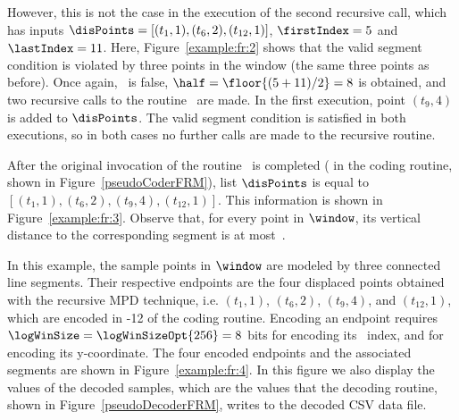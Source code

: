\clearpage




However, this is not the case in the execution of the second recursive call, which has inputs $\disPoints=[(t_1,1), (t_{6},2), (t_{12},1)]$, $\firstIndex = 5$ and $\lastIndex = 11$. Here, Figure~\ref{example:fr:2} shows that the valid segment condition is violated by three points in the window (the same three points as before). Once again, \validSegment\ is false, $\half=\floor{(5 + 11) / 2}=8$ is obtained, and two recursive calls to the routine \getDisplacedPointsMethod\ are made. In the first execution, point $(t_9,4)$ is added to $\disPoints$. The valid segment condition is satisfied in both executions, so in both cases no further calls are made to the recursive routine. 


After the original invocation of the routine \getDisplacedPointsMethod\ is completed ( in the coding routine, shown in Figure~\ref{pseudoCoderFRM}), list $\disPoints$ is equal to $[(t_1,1), (t_{6},2), (t_9,4), (t_{12},1)]$. This information is shown in Figure~\ref{example:fr:3}. Observe that, for every point in $\window$, its vertical distance to the corresponding segment is at most~\maxerror.


\vspace{+5pt}


\clearpage


In this example, the sample points in $\window$ are modeled by three connected line segments. Their respective endpoints are the four displaced points obtained with the recursive MPD technique, i.e. $(t_1,1)$, $(t_6,2)$, $(t_9,4)$, and $(t_{12},1)$, which are encoded in -12 of the coding routine. Encoding an endpoint requires $\logWinSize = \logWinSizeOpt{256}=8$ bits for encoding its \window\ index, and \tobitexp for encoding its y-coordinate. The four encoded endpoints and the associated segments are shown in Figure~\ref{example:fr:4}. In this figure we also display the values of the decoded samples, which are the values that the decoding routine, shown in Figure~\ref{pseudoDecoderFRM}, writes to the decoded CSV data file. 


\vspace{+5pt}


\clearpage

